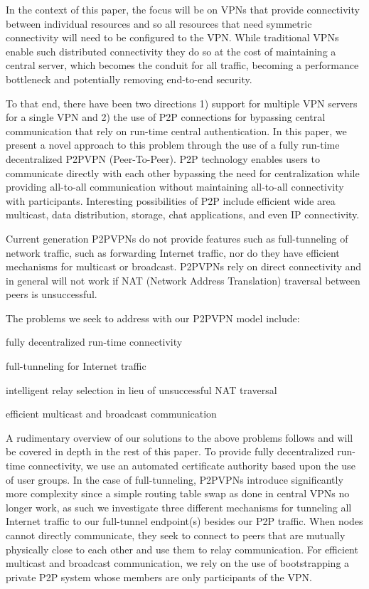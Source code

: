 \documentclass{sig-alternate}
\begin{document}
In the context of this paper, the focus will be on VPNs that provide
connectivity between individual resources and so all resources that need
symmetric connectivity will need to be configured to the VPN.  While
traditional VPNs enable such distributed connectivity they do so at the
cost of maintaining a central server, which becomes the conduit for all traffic,
becoming a performance bottleneck and potentially removing end-to-end security.

To that end, there have been two directions 1) support for multiple VPN servers
for a single VPN\cite{openvpn} and 2) the use of P2P connections for bypassing central
communication that rely on run-time central authentication\cite{hamachi, wippien}.  In this paper, we
present a novel approach to this problem through the use of a fully run-time
decentralized P2PVPN (Peer-To-Peer).  P2P technology enables users to
communicate directly with each other bypassing the need for centralization
while providing all-to-all communication without maintaining all-to-all
connectivity with participants.  Interesting possibilities of P2P include
efficient wide area multicast, data distribution, storage, chat applications,
and even IP connectivity.

Current generation P2PVPNs do not provide features such as full-tunneling of
network traffic, such as forwarding Internet traffic, nor do they have efficient
mechanisms for multicast or broadcast.  P2PVPNs rely on direct connectivity
and in general will not work if NAT (Network Address Translation) traversal
between peers is unsuccessful.

The problems we seek to address with our P2PVPN model include:
\begin{itemize}
\small {
\setlength{\itemsep}{0pt}
\setlength{\parskip}{0pt}
\item fully decentralized run-time connectivity
\item full-tunneling for Internet traffic
\item intelligent relay selection in lieu of unsuccessful NAT traversal
\item efficient multicast and broadcast communication
}
\end{itemize}

A rudimentary overview of our solutions to the above problems follows and will
be covered in depth in the rest of this paper.  To provide fully decentralized
run-time connectivity, we use an automated certificate authority based
upon the use of user groups.  In the case of full-tunneling, P2PVPNs introduce
significantly more complexity since a simple routing table swap as done in
central VPNs no longer work, as such we investigate three different mechanisms
for tunneling all Internet traffic to our full-tunnel endpoint(s) besides our
P2P traffic.  When nodes cannot directly communicate, they seek to connect to
peers that are mutually physically close to each other and use them to relay
communication.  For efficient multicast and broadcast communication, we rely on
the use of bootstrapping a private P2P system whose members are only
participants of the VPN.
\end{document}
